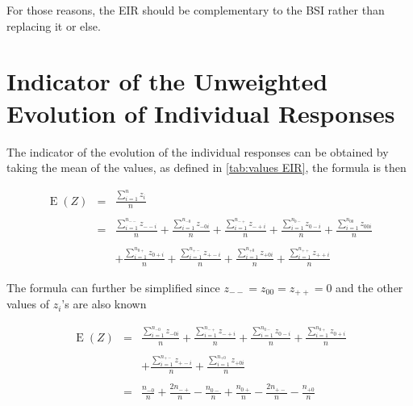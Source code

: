 \documentclass[12pt,a4paper,oneside]{book}
\DeclareMathOperator{\E}{E}
\begin{document}
For those reasons, the EIR should be complementary to the BSI rather than replacing it or else.



\section{Indicator of the Unweighted Evolution of Individual Responses}


The indicator of the evolution of the individual responses can be obtained by taking the mean of the values, as defined in \autoref{tab:values EIR}, the formula is then

\begin{eqnarray}
    \E(Z) &=&  \frac{ \sum_{i=1}^n z_i}{n} \\ \nonumber \\
        &=&  \frac{ \sum_{i=1}^{n_{--}} z_{--i}}{n} 
     +  \frac{\sum_{i=1}^{n_{-0}} z_{-0i} }{n} 
    +  \frac{\sum_{i=1}^{n_{-+}} z_{-+i}}{n} 
    +  \frac{\sum_{i=1}^{n_{0-}} z_{0-i} }{n} 
    +  \frac{\sum_{i=1}^{n_{00}} z_{00i} }{n}  \nonumber \\ \nonumber \\
    &&  +  \frac{\sum_{i=1}^{n_{0+}} z_{0+i}}{n} 
    +  \frac{\sum_{i=1}^{n_{+-}} z_{+-i} }{n} 
    +  \frac{\sum_{i=1}^{n_{+0}} z_{+0i} }{n} 
    +  \frac{\sum_{i=1}^{n_{++}} z_{++i}}{n} 
\end{eqnarray}

The formula can further be simplified since $z_{--} = z_{00} = z_{++} = 0$ and the other values of $z_i$'s are also known

\begin{eqnarray}
    \E(Z) &=&  
      \frac{\sum_{i=1}^{n_{-0}} z_{-0i} }{n} 
    +  \frac{\sum_{i=1}^{n_{-+}} z_{-+i}}{n} 
    +  \frac{\sum_{i=1}^{n_{0-}} z_{0-i} }{n} 
    +  \frac{\sum_{i=1}^{n_{0+}} z_{0+i}}{n}  \nonumber \\ \nonumber \\
&&  +  \frac{\sum_{i=1}^{n_{+-}} z_{+-i} }{n} 
    +  \frac{\sum_{i=1}^{n_{+0}} z_{+0i} }{n}  \\ \nonumber \\
    &=&  \frac{n_{-0}}{n} 
    +   \frac{2n_{-+}}{n} 
    -    \frac{n_{0-}}{n} 
    +    \frac{n_{0+}}{n}  
    -   \frac{2n_{+-}}{n} 
    -    \frac{n_{+0}}{n} 
\end{eqnarray}
\end{document}
